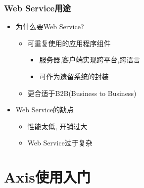 \documentclass[CJKutf8,compress,hyperref]{beamer}
\begin{document}
\begin{CJK}{UTF8}{song}
        \begin{frame}
                \frametitle{ Web Service用途}
                \begin{itemize}
                        \item 为什么要Web Service?
                                \begin{itemize}
                                        \item 可重复使用的应用程序组件
                                                \begin{itemize}
                                                        \item 服务器,客户端实现跨平台,跨语言
                                                        \item 可作为遗留系统的封装
                                                \end{itemize}      
                                        \item 更合适于B2B(Business to Business)
                                \end{itemize}
                        \item Web Service的缺点
                                \begin{itemize}
                                        \item 性能太低, 开销过大
                                        \item Web Service过于复杂
                                \end{itemize}

                \end{itemize}
        \end{frame}

        \section{ Axis使用入门}


\end{CJK}
\end{document}
